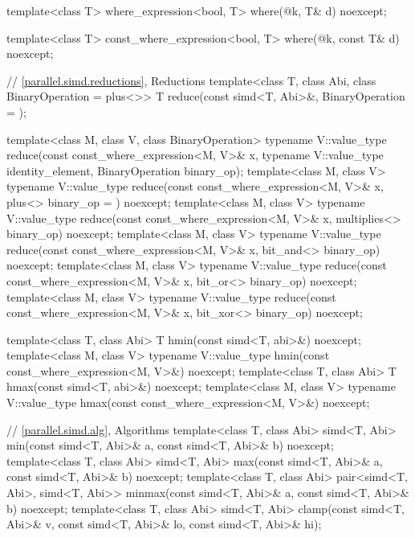\begin{codeblock}
{{  template<class T>
    where_expression<bool, T>
      where(@\seebelow@ k, T& d) noexcept;

  template<class T>
    const_where_expression<bool, T>
      where(@\seebelow@ k, const T& d) noexcept;

  // \ref{parallel.simd.reductions}, Reductions
  template<class T, class Abi, class BinaryOperation = plus<>>
    T reduce(const simd<T, Abi>&,
             BinaryOperation = {});

  template<class M, class V, class BinaryOperation>
    typename V::value_type reduce(const const_where_expression<M, V>& x,
                                  typename V::value_type identity_element,
                                  BinaryOperation binary_op);
  template<class M, class V>
    typename V::value_type reduce(const const_where_expression<M, V>& x,
                                  plus<> binary_op = {}) noexcept;
  template<class M, class V>
    typename V::value_type reduce(const const_where_expression<M, V>& x,
                                  multiplies<> binary_op) noexcept;
  template<class M, class V>
    typename V::value_type reduce(const const_where_expression<M, V>& x,
                                  bit_and<> binary_op) noexcept;
  template<class M, class V>
    typename V::value_type reduce(const const_where_expression<M, V>& x,
                                  bit_or<> binary_op) noexcept;
  template<class M, class V>
    typename V::value_type reduce(const const_where_expression<M, V>& x,
                                  bit_xor<> binary_op) noexcept;

  template<class T, class Abi>
    T hmin(const simd<T, abi>&) noexcept;
  template<class M, class V>
    typename V::value_type hmin(const const_where_expression<M, V>&) noexcept;
  template<class T, class Abi>
    T hmax(const simd<T, abi>&) noexcept;
  template<class M, class V>
    typename V::value_type hmax(const const_where_expression<M, V>&) noexcept;

  // \ref{parallel.simd.alg}, Algorithms
  template<class T, class Abi>
    simd<T, Abi>
      min(const simd<T, Abi>& a, const simd<T, Abi>& b) noexcept;
  template<class T, class Abi>
    simd<T, Abi>
      max(const simd<T, Abi>& a, const simd<T, Abi>& b) noexcept;
  template<class T, class Abi>
    pair<simd<T, Abi>, simd<T, Abi>>
      minmax(const simd<T, Abi>& a, const simd<T, Abi>& b) noexcept;
  template<class T, class Abi>
    simd<T, Abi>
      clamp(const simd<T, Abi>& v,
            const simd<T, Abi>& lo,
            const simd<T, Abi>& hi);
}
}
\end{codeblock}

